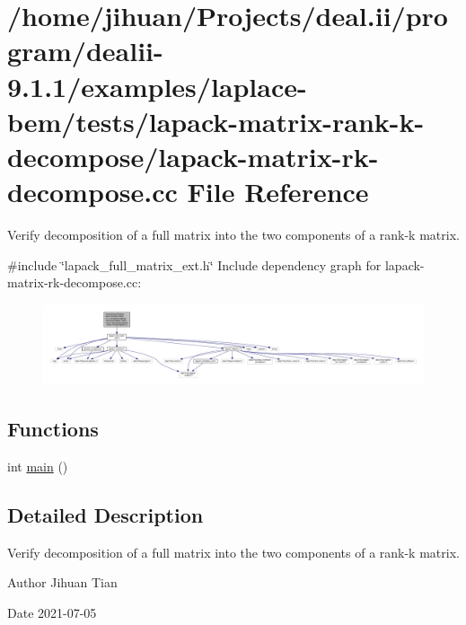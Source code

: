 \hypertarget{lapack-matrix-rk-decompose_8cc}{}\section{/home/jihuan/\+Projects/deal.ii/program/dealii-\/9.1.1/examples/laplace-\/bem/tests/lapack-\/matrix-\/rank-\/k-\/decompose/lapack-\/matrix-\/rk-\/decompose.cc File Reference}
\label{lapack-matrix-rk-decompose_8cc}


Verify decomposition of a full matrix into the two components of a rank-\/k matrix.  


{\ttfamily \#include \char`\"{}lapack\+\_\+full\+\_\+matrix\+\_\+ext.\+h\char`\"{}}\newline
Include dependency graph for lapack-\/matrix-\/rk-\/decompose.cc\+:
\nopagebreak
\begin{figure}[H]
\begin{center}
\leavevmode
\includegraphics[width=350pt]{lapack-matrix-rk-decompose_8cc__incl}
\end{center}
\end{figure}
\subsection*{Functions}
\begin{DoxyCompactItemize}
\item 
int \hyperlink{lapack-matrix-rk-decompose_8cc_ae66f6b31b5ad750f1fe042a706a4e3d4}{main} ()
\end{DoxyCompactItemize}


\subsection{Detailed Description}
Verify decomposition of a full matrix into the two components of a rank-\/k matrix. 

\begin{DoxyAuthor}{Author}
Jihuan Tian 
\end{DoxyAuthor}
\begin{DoxyDate}{Date}
2021-\/07-\/05 
\end{DoxyDate}


